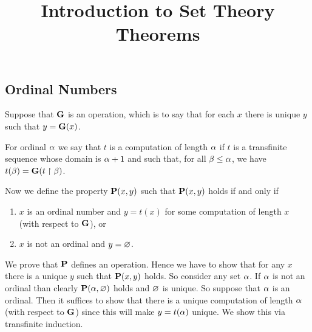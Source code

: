 



\title{Introduction to Set Theory Theorems}




\qformat{}

\begin{questions}


\setcounter{section}{5}
\section{Ordinal Numbers}


\begin{solution}
    \def\P{\prop{P}}
    \def\G{\prop{G}}
    \def\R{\prop{R}}
    \def\F{\prop{F}}
    Suppose that $\G$ is an operation, which is to say that for each $x$ there is unique $y$ such that $y = \G(x)$.

    For ordinal $\alpha$ we say that $t$ is a computation of length $\alpha$ if $t$ is a transfinite sequence whose domain is $\alpha+1$ and such that, for all $\beta \leq \alpha$, we have $t(\b) = \G(t \rest \b)$.

    Now we define the property $\P(x,y)$ such that $\P(x,y)$ holds if and only if
    \begin{enumerate}
        \item $x$ is an ordinal number and $y = t(x)$ for some computation of length $x$ (with respect to $\G$), or
        \item $x$ is not an ordinal and $y = \varnothing$.
    \end{enumerate}

    We prove that $\P$ defines an operation.
    Hence we have to show that  for any $x$ there is a unique $y$ such that $\P(x,y)$ holds.
    So consider any set $\alpha$.
    If $\alpha$ is not an ordinal than clearly $\P(\a,\es)$ holds and $\varnothing$ is unique.
    So suppose that $\alpha$ is an ordinal.
    Then it suffices to show that there is a unique computation of length $\alpha$ (with respect to $\G$) since this will make $y = t(\alpha)$ unique.
    We show this via transfinite induction.


\end{solution}
\end{questions}
